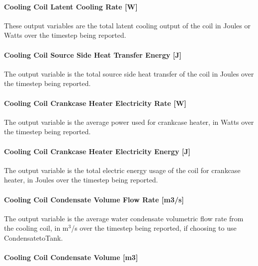 \paragraph{Cooling Coil Latent Cooling Rate {[}W{]}}\label{cooling-coil-latent-cooling-rate-w-3}

These output variables are the total latent cooling output of the coil in Joules or Watts over the timestep being reported.

\paragraph{Cooling Coil Source Side Heat Transfer Energy {[}J{]}}\label{cooling-coil-source-side-heat-transfer-energy-j-2}

The output variable is the total source side heat transfer of the coil in Joules over the timestep being reported.

\paragraph{Cooling Coil Crankcase Heater Electricity Rate {[}W{]}}\label{cooling-coil-crankcase-heater-electric-power-w}

The output variable is the average power used for crankcase heater, in Watts over the timestep being reported.

\paragraph{Cooling Coil Crankcase Heater Electricity Energy {[}J{]}}\label{cooling-coil-crankcase-heater-electric-energy-j-1}

The output variable is the total electric energy usage of the coil for crankcase heater, in Joules over the timestep being reported.

\paragraph{Cooling Coil Condensate Volume Flow Rate {[}m3/s{]}}\label{cooling-coil-condensate-volume-flow-rate-m3s-5}

The output variable is the average water condensate volumetric flow rate from the cooling coil, in m\(^{3}\)/s over the timestep being reported, if choosing to use CondensatetoTank.

\paragraph{Cooling Coil Condensate Volume {[}m3{]}}\label{cooling-coil-condensate-volume-m3-5}

